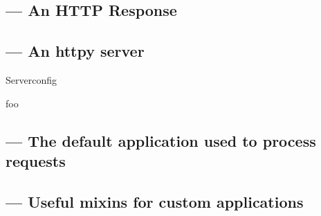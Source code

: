 \subsection{ ---
            An HTTP Response}

\subsection{ ---
            An httpy server}

\begin{classdesc}{Server}{config}

foo
\end{classdesc}

\subsection{ ---
            The default application used to process requests}

\subsection{ ---
            Useful mixins for custom applications}

